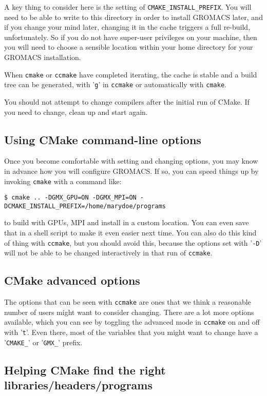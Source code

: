 \documentclass{article}[12pt,a4paper,twoside]
\newcommand{\gromacs}{GROMACS}
\newcommand{\cmake}{CMake}
\begin{document}
A key thing to consider here is the setting of
\verb+CMAKE_INSTALL_PREFIX+. You will need to be able to write to
this directory in order to install \gromacs{} later, and if you change
your mind later, changing it in the cache triggers a full re-build,
unfortunately. So if you do not have super-user privileges on your
machine, then you will need to choose a sensible location within your
home directory for your \gromacs{} installation.

When \verb+cmake+ or \verb+ccmake+ have completed iterating, the
cache is stable and a build tree can be generated, with '\verb+g+' in
\verb+ccmake+ or automatically with \verb+cmake+.

You should not attempt to change compilers after the initial run of
\cmake{}. If you need to change, clean up and start again.

\subsection{Using CMake command-line options}
Once you become comfortable with setting and changing options, you
may know in advance how you will configure GROMACS. If so, you can
speed things up by invoking \verb+cmake+ with a command like:
\begin{verbatim}
$ cmake .. -DGMX_GPU=ON -DGMX_MPI=ON -DCMAKE_INSTALL_PREFIX=/home/marydoe/programs
\end{verbatim}
to build with GPUs, MPI and install in a custom location. You can even
save that in a shell script to make it even easier next time. You can
also do this kind of thing with \verb+ccmake+, but you should avoid
this, because the options set with '\verb+-D+' will not be able to be
changed interactively in that run of \verb+ccmake+.

\subsection{CMake advanced options}
The options that can be seen with \verb+ccmake+ are ones that we
think a reasonable number of users might want to consider
changing. There are a lot more options available, which you can see by
toggling the advanced mode in \verb+ccmake+ on and off with
'\verb+t+'. Even there, most of the variables that you might want to
change have a '\verb+CMAKE_+' or '\verb+GMX_+' prefix.

\subsection{Helping CMake find the right libraries/headers/programs}
\end{document}

